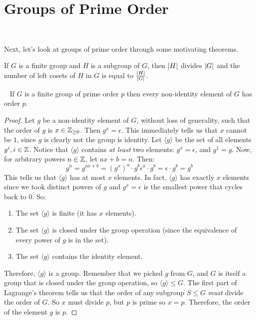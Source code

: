 \section{Groups of Prime Order}~\label{sec:prime-order}

Next, let's look at groups of prime order through some motivating theorems.

\begin{theorem}[Lagrange]\label{thm:lagrange}
  If $G$ is a finite group and $H$ is a subgroup of $G$,
  then $\lvert H\rvert$ divides $\lvert G\rvert$ and the number of left cosets of $H$
  in $G$ is equal to $\frac{\lvert H\rvert}{\lvert G\rvert}$.~\cite[p.89, Theorem 8]{DummitFoote}
\end{theorem}

\begin{proposition}~\label{prop:prime-order-p}
  If $G$ is a finite group of prime order $p$ then
  every non-identity element of $G$ has order $p$.
  
  \begin{proof}
    Let $g$ be a non-identity element of $G$, without loss of generality,
    such that the order of $g$ is $x \in \mathbb{Z}_{\ge 0}$.
    Then $g^x = \epsilon$.
    This immediately tells us that $x$ cannot be $1$, since
    $g$ is clearly not the group is identity.
    Let $\langle g \rangle$ be the set of all elements $g^i, i \in \mathbb{Z}$.
    Notice that $\langle g \rangle$ contains \emph{at least} two elements:
    $g^x = \epsilon$, and $g^1 = g$.
    Now, for arbitrary powers $n \in \mathbb{Z}$, let $ax + b = n$. Then:
    \[ g^n = g^{ax + b} = {(g^x)}^a \cdot g^b \epsilon^a \cdot g^b
       = \epsilon \cdot g^b = g^b \]
    This tells us that $\langle g \rangle$ has at most $x$ elements.
    In fact, $\langle g \rangle$ has exactly $x$ elements since we took distinct
    powers of $g$ and $g^x = \epsilon$ is the smallest power that cycles back to $0$.
    So;
    \begin{enumerate}
      \item The set $\langle g \rangle$ is finite (it has $x$ elements).
      \item The set $\langle g \rangle$ is closed under the group operation
        (since the equivalence of every power of $g$ is in the set).
      \item The set $\langle g \rangle$ contains the identity element.
    \end{enumerate}
    Therefore, $\langle g \rangle$ is a group.
    Remember that we picked $g$ from $G$, and $G$ is itself a group that
    is closed under the group operation, so $\langle g \rangle \le G$.
    The first part of Lagrange's theorem tells us that the order of any
    subgroup $S \le G$ \emph{must} divide the order of $G$.
    So $x$ must divide $p$, but $p$ is prime so $x = p$.
    Therefore, the order of the element $g$ is $p$.
  \end{proof}
\end{proposition}

